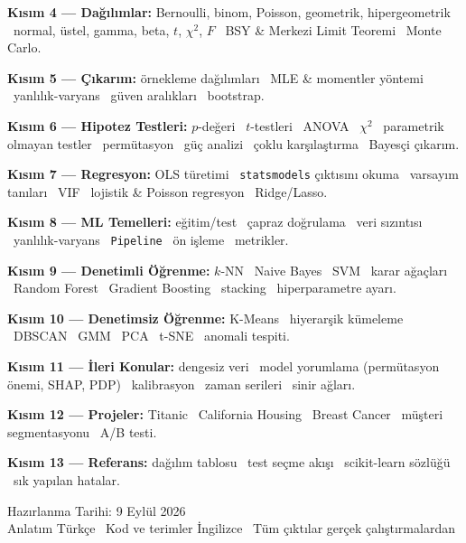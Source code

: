 \documentclass[11pt,a4paper]{article}
\newcommand{\code}[1]{\texttt{\color{koyuGri}#1}}
\begin{document}
\begin{titlepage}
\begin{center}
{{\textbf{Kısım 4 --- Dağılımlar:} Bernoulli, binom, Poisson, geometrik,
hipergeometrik \textbullet\ normal, üstel, gamma, beta, $t$, $\chi^2$, $F$
\textbullet\ BSY \& Merkezi Limit Teoremi \textbullet\ Monte Carlo.\vspace{2pt}

\textbf{Kısım 5 --- Çıkarım:} örnekleme dağılımları \textbullet\ MLE \&
momentler yöntemi \textbullet\ yanlılık-varyans \textbullet\ güven aralıkları
\textbullet\ bootstrap.\vspace{2pt}

\textbf{Kısım 6 --- Hipotez Testleri:} $p$-değeri \textbullet\ $t$-testleri
\textbullet\ ANOVA \textbullet\ $\chi^2$ \textbullet\ parametrik olmayan
testler \textbullet\ permütasyon \textbullet\ güç analizi \textbullet\ çoklu
karşılaştırma \textbullet\ Bayesçi çıkarım.\vspace{2pt}

\textbf{Kısım 7 --- Regresyon:} OLS türetimi \textbullet\ \code{statsmodels}
çıktısını okuma \textbullet\ varsayım tanıları \textbullet\ VIF \textbullet\
lojistik \& Poisson regresyon \textbullet\ Ridge/Lasso.\vspace{2pt}

\textbf{Kısım 8 --- ML Temelleri:} eğitim/test \textbullet\ çapraz doğrulama
\textbullet\ veri sızıntısı \textbullet\ yanlılık-varyans \textbullet\
\code{Pipeline} \textbullet\ ön işleme \textbullet\ metrikler.\vspace{2pt}

\textbf{Kısım 9 --- Denetimli Öğrenme:} $k$-NN \textbullet\ Naive Bayes
\textbullet\ SVM \textbullet\ karar ağaçları \textbullet\ Random Forest
\textbullet\ Gradient Boosting \textbullet\ stacking \textbullet\
hiperparametre ayarı.\vspace{2pt}

\textbf{Kısım 10 --- Denetimsiz Öğrenme:} K-Means \textbullet\ hiyerarşik
kümeleme \textbullet\ DBSCAN \textbullet\ GMM \textbullet\ PCA \textbullet\
t-SNE \textbullet\ anomali tespiti.\vspace{2pt}

\textbf{Kısım 11 --- İleri Konular:} dengesiz veri \textbullet\ model
yorumlama (permütasyon önemi, SHAP, PDP) \textbullet\ kalibrasyon
\textbullet\ zaman serileri \textbullet\ sinir ağları.\vspace{2pt}

\textbf{Kısım 12 --- Projeler:} Titanic \textbullet\ California Housing
\textbullet\ Breast Cancer \textbullet\ müşteri segmentasyonu \textbullet\
A/B testi.\vspace{2pt}

\textbf{Kısım 13 --- Referans:} dağılım tablosu \textbullet\ test seçme akışı
\textbullet\ scikit-learn sözlüğü \textbullet\ sık yapılan hatalar.\vspace{2pt}}}
\end{center}

\vfill
{\color{ortaGri}\large Hazırlanma Tarihi: 9 Eylül 2026}\\[4pt]
{\color{ortaGri} Anlatım Türkçe \textbullet\ Kod ve terimler İngilizce \textbullet\ Tüm çıktılar gerçek çalıştırmalardan}
\vspace*{0.3cm}
\end{titlepage}
\end{document}
